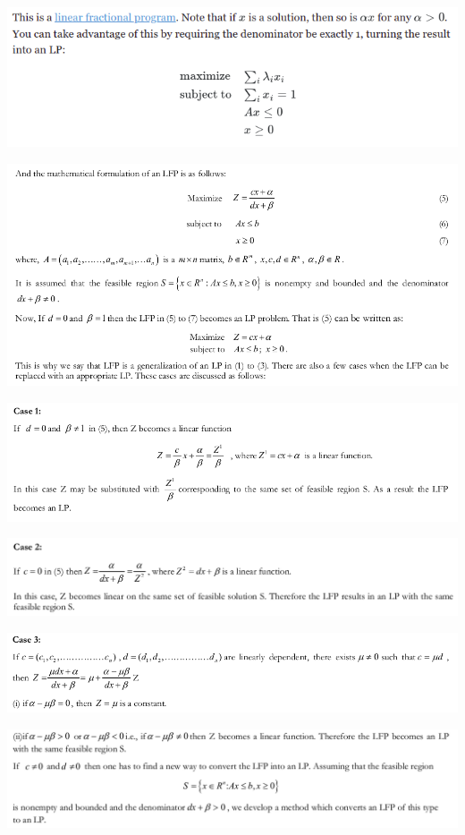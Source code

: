 \documentclass[a4paper]{article}
\begin{document}
\begin{center}
	\includegraphics[width=0.75\textheight]{lfp_3}
\end{center}

\pagebreak

\begin{center}
	\includegraphics[width=0.75\textheight]{lfp_4}
\end{center}

\begin{center}
	\includegraphics[width=0.75\textheight]{lfp_5}
\end{center}

\begin{center}
	\includegraphics[width=0.75\textheight]{lfp_6}
\end{center}

\begin{center}
	\includegraphics[width=0.75\textheight]{lfp_7}
\end{center}

\begin{center}
	\includegraphics[width=0.75\textheight]{lfp_8}
\end{center}
\end{document}
